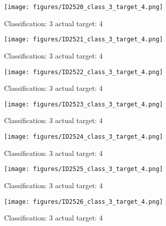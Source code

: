 \begin{figure}[h!]
\begin{center}
\texttt{[image: figures/ID2520\_class\_3\_target\_4.png]}
\end{center}
\caption{ Classification: 3 actual target: 4}
\label{fig:ID2520_class_3_target_4}
\end{figure}
\begin{figure}[h!]
\begin{center}
\texttt{[image: figures/ID2521\_class\_3\_target\_4.png]}
\end{center}
\caption{ Classification: 3 actual target: 4}
\label{fig:ID2521_class_3_target_4}
\end{figure}
\begin{figure}[h!]
\begin{center}
\texttt{[image: figures/ID2522\_class\_3\_target\_4.png]}
\end{center}
\caption{ Classification: 3 actual target: 4}
\label{fig:ID2522_class_3_target_4}
\end{figure}
\begin{figure}[h!]
\begin{center}
\texttt{[image: figures/ID2523\_class\_3\_target\_4.png]}
\end{center}
\caption{ Classification: 3 actual target: 4}
\label{fig:ID2523_class_3_target_4}
\end{figure}
\begin{figure}[h!]
\begin{center}
\texttt{[image: figures/ID2524\_class\_3\_target\_4.png]}
\end{center}
\caption{ Classification: 3 actual target: 4}
\label{fig:ID2524_class_3_target_4}
\end{figure}
\begin{figure}[h!]
\begin{center}
\texttt{[image: figures/ID2525\_class\_3\_target\_4.png]}
\end{center}
\caption{ Classification: 3 actual target: 4}
\label{fig:ID2525_class_3_target_4}
\end{figure}
\begin{figure}[h!]
\begin{center}
\texttt{[image: figures/ID2526\_class\_3\_target\_4.png]}
\end{center}
\caption{ Classification: 3 actual target: 4}
\label{fig:ID2526_class_3_target_4}
\end{figure}
